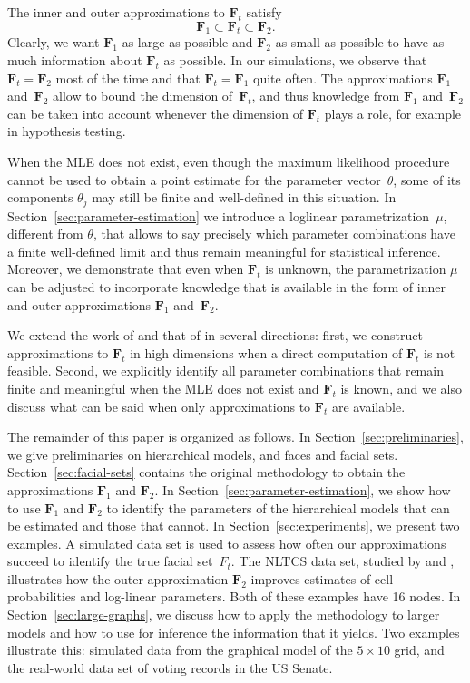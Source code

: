 \documentclass[aos,noinfoline]{imsart}
\newcommand{\Fbf}{\mathbf{F}}
\theoremstyle{remark}
\theoremstyle{definition}
\begin{document}
The inner and outer approximations to $\Fbf_{t}$ satisfy
$${\mathbf F}_1\subset {\mathbf F}_t\subset {\mathbf F}_2.$$
Clearly, we want  ${\mathbf F}_1$ as large as possible and ${\mathbf F}_2$ as small as possible to have as much information about ${\mathbf F}_t$ as possible.
In our simulations, we observe that $\Fbf_{t}=\Fbf_{2}$ most of the time and that $\Fbf_{t}=\Fbf_{1}$ quite often.
%
The approximations $\Fbf_{1}$ and~$\Fbf_{2}$ allow to bound the dimension of~$\Fbf_{t}$, and thus knowledge from
$\Fbf_{1}$ and~$\Fbf_{2}$ can be taken into account whenever the dimension of $\Fbf_{t}$ plays a role, for example in
hypothesis testing.

When the MLE does not exist, even though the maximum likelihood procedure cannot be used to obtain a point estimate for the
parameter vector~$\theta$, some of its components $\theta_{j}$ may still be finite and well-defined in this
situation.  In Section~\ref{sec:parameter-estimation} we introduce a loglinear parametrization~$\mu$, different from
$\theta$, that allows to say precisely which parameter combinations have a finite well-defined limit and thus remain
meaningful for statistical inference.  Moreover, we demonstrate that even when $\Fbf_{t}$ is unknown, the
parametrization $\mu$ can be adjusted to incorporate knowledge that is available in the form of inner and outer
approximations $\Fbf_{1}$ and~$\Fbf_{2}$.

We extend the work of \citet{FienbergRinaldo12:MLE_in_loglinear_models} and that of \cite{Geyer09:Likelihood_inference_in_exponential_families} in several directions: first, we construct approximations to $\Fbf_{t}$ in high dimensions when a direct computation of $\Fbf_{t}$ is not feasible.  Second, we explicitly identify all parameter combinations that remain finite and meaningful when the MLE does not exist and $\Fbf_{t}$ is known, and we also discuss what can be said  when only approximations to $\Fbf_{t}$ are available.

\medskip

The remainder of this paper is organized as follows. In Section~\ref{sec:preliminaries}, we give preliminaries on hierarchical models, and faces and facial sets. Section~\ref{sec:facial-sets} contains the original methodology to obtain the approximations
$\Fbf_1$ and $\Fbf_2$.
In Section~\ref{sec:parameter-estimation}, we show how to use $\Fbf_1$ and $\Fbf_2$ to identify the parameters of the hierarchical models that can be estimated and those that cannot. 
In Section~\ref{sec:experiments}, we present  two examples.  A simulated data set is used to assess how often our approximations succeed to identify the true facial set~$F_{t}$.  The NLTCS data set, studied by \citet{DobraEroshevaFienberg03} and \citet{DobraLenkoski11:Copula_Gaussian_graphical_models}, illustrates how the outer approximation $\Fbf_2$ improves estimates of cell probabilities and log-linear parameters.
Both of these examples have 16 nodes. In Section~\ref{sec:large-graphs}, we discuss how to apply the methodology to larger models and how to use for inference the information that it yields.  Two examples illustrate this:
simulated data from the graphical model of the $5\times 10$ grid, and the real-world data set of voting records in the US Senate.
\end{document}
